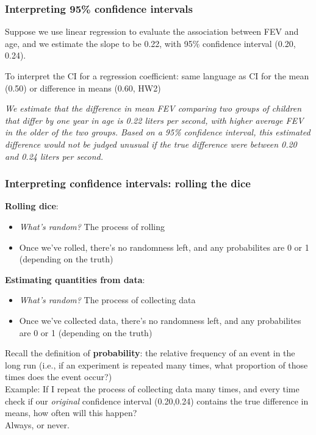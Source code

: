 \documentclass[12pt, 
hyperref={colorlinks=true, linkcolor=blue, urlcolor=cyan}]{beamer}
\begin{document}
\begin{frame}
\frametitle{Interpreting 95\% confidence intervals}

Suppose we use linear regression to evaluate the association between FEV and age, and we estimate the slope to be 0.22, with 95\% confidence interval (0.20, 0.24).

To interpret the CI for a regression coefficient: same language as CI for the mean (0.50) or difference in means (0.60, HW2)

\textit{We estimate that the difference in mean FEV comparing two groups of children that differ by one year in age is 0.22 liters per second, with higher average FEV in the older of the two groups. \color{blue} Based on a 95\% confidence interval, this estimated difference would not be judged unusual if the true difference were between 0.20 and 0.24 liters per second. \color{black}}
\end{frame}

\begin{frame}
\frametitle{Interpreting confidence intervals: rolling the dice}

\textbf{Rolling dice}:\vspace{-0.3cm}
\begin{itemize}
\item \textit{What's random?} The process of rolling
\item Once we've rolled, there's no randomness left, and any probabilites are 0 or 1 (depending on the truth)
\end{itemize}

\pause
\textbf{Estimating quantities from data}:\vspace{-0.3cm}
\begin{itemize}
\item \textit{What's random?} The process of collecting data
\item Once we've collected data, there's no randomness left, and any probabilites are 0 or 1 (depending on the truth)
\end{itemize}

\pause
\begin{small}
Recall the definition of \textbf{probability}: the relative frequency of an event in the long run (i.e., if an experiment is repeated many times, what proportion of those times does the event occur?)\\ \pause
\color{blue} Example: \color{black} If I repeat the process of collecting data many times, and every time check if our \textit{original} confidence interval (0.20,0.24) contains the true difference in means, how often will this happen?\\ \pause \hfill \color{red} Always, or never.
\end{small}

\end{frame}
\end{document}
